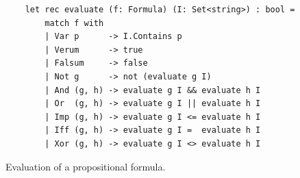 \begin{figure}[!ht]
  \centering
\begin{verbatim}
    let rec evaluate (f: Formula) (I: Set<string>) : bool =
        match f with
        | Var p      -> I.Contains p
        | Verum      -> true
        | Falsum     -> false
        | Not g      -> not (evaluate g I)
        | And (g, h) -> evaluate g I && evaluate h I
        | Or  (g, h) -> evaluate g I || evaluate h I
        | Imp (g, h) -> evaluate g I <= evaluate h I
        | Iff (g, h) -> evaluate g I =  evaluate h I
        | Xor (g, h) -> evaluate g I <> evaluate h I
\end{verbatim}
\vspace*{-0.3cm}
  \caption{Evaluation of a propositional formula.}
  \label{fig:evaluate.py}
\end{figure} 

